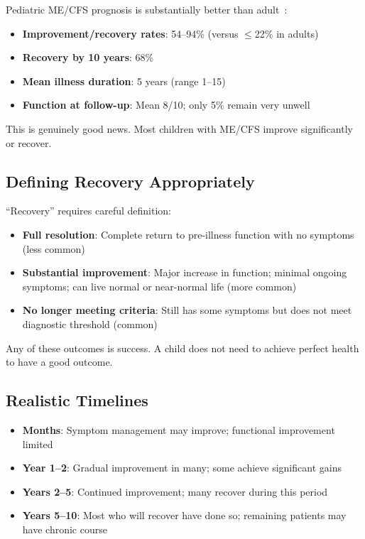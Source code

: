 Pediatric ME/CFS prognosis is substantially better than adult~\cite{Rowe2019pediatric}:

\begin{itemize}
    \item \textbf{Improvement/recovery rates}: 54--94\% (versus $\leq$22\% in adults)
    \item \textbf{Recovery by 10 years}: 68\%
    \item \textbf{Mean illness duration}: 5 years (range 1--15)
    \item \textbf{Function at follow-up}: Mean 8/10; only 5\% remain very unwell
\end{itemize}

This is genuinely good news. Most children with ME/CFS improve significantly or recover.

\subsection{Defining Recovery Appropriately}

``Recovery'' requires careful definition:

\begin{itemize}
    \item \textbf{Full resolution}: Complete return to pre-illness function with no symptoms (less common)
    \item \textbf{Substantial improvement}: Major increase in function; minimal ongoing symptoms; can live normal or near-normal life (more common)
    \item \textbf{No longer meeting criteria}: Still has some symptoms but does not meet diagnostic threshold (common)
\end{itemize}

Any of these outcomes is success. A child does not need to achieve perfect health to have a good outcome.

\subsection{Realistic Timelines}

\begin{itemize}
    \item \textbf{Months}: Symptom management may improve; functional improvement limited
    \item \textbf{Year 1--2}: Gradual improvement in many; some achieve significant gains
    \item \textbf{Years 2--5}: Continued improvement; many recover during this period
    \item \textbf{Years 5--10}: Most who will recover have done so; remaining patients may have chronic course
\end{itemize}

